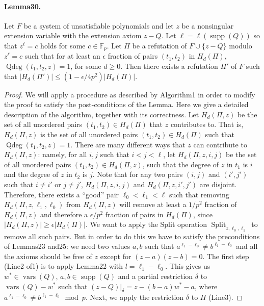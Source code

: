 \documentclass[10pt,a4paper]{article}
\DeclareMathOperator{\supp}{supp}
\DeclareMathOperator{\vars}{vars}
\DeclareMathOperator{\Qdeg}{Qdeg}
\DeclareMathOperator{\Split}{Split}
\begin{document}
\paragraph{Lemma30.} Let $F$ be a system of unsatisfiable polynomials and let $z$ be a nonsingular extension variable with the extension axiom $z-Q$. Let $\ell=\ell(\supp(Q))$ so that $z^{\ell}=c$ holds for some $c\in\mathbb F_p$. Let $\Pi$ be a refutation of $F\cup\{z-Q\}$ modulo $z^{\ell}=c$ such that for at least an $\epsilon$ fraction of pairs $(t_1,t_2)$ in $H_d(\Pi)$, $\Qdeg(t_1,t_2,z)=1$, for some $d\geq0$. Then there exists a refutation $\Pi'$ of $F$ such that $|H_d(\Pi')|\leq(1-\epsilon/4p^2)|H_d(\Pi)|$.
\begin{proof}
We will apply a procedure as described by Algorithm1 in order to modify the proof to satisfy the post-conditions of the Lemma. Here we give a detailed description of the algorithm, together with its correctness. Let $H_d(\Pi,z)$ be the set of all unordered pairs $(t_1,t_2)\in H_d(\Pi)$ that $z$ contributes to. That is, $H_d(\Pi,z)$ is the set of all unordered pairs $(t_1,t_2)\in H_d(\Pi)$ such that $\Qdeg(t_1,t_2,z)=1$. There are many different ways that $z$ can contribute to $H_d(\Pi,z)$: namely, for all $i,j$ such that $i<j<\ell$, let $H_d(\Pi,z,i,j)$ be the set of all unordered pairs $(t_1,t_2)\in H_d(\Pi,z)$, such that the degree of $z$ in $t_1$ is $i$ and the degree of $z$ in $t_2$ is $j$. Note that for any two pairs $(i,j)$ and $(i',j')$ such that $i\neq i'$ or $j\neq j'$, $H_d(\Pi,z,i,j)$ and $H_d(\Pi,z,i',j')$ are disjoint. Therefore, there exists a ``good'' pair $\ell_0<\ell_1<\ell$ such that removing $H_d(\Pi,z,\ell_1,\ell_0)$ from $H_d(\Pi,z)$ will remove at least a $1/p^2$ fraction of $H_d(\Pi,z)$ and therefore a $\epsilon/p^2$ fraction of pairs in $H_d(\Pi)$, since $|H_d(\Pi,z)|\geq\epsilon|H_d(\Pi)|$.
We want to apply the Split operation $\Split_{z,\ell_0,\ell_1}$ to remove all such pairs. But in order to do this we have to satisfy the preconditions of Lemmas23 and25: we need two values $a,b$ such that $a^{\ell_1-\ell_0}\neq b^{\ell_1-\ell_0}$ and all the axioms should be free of $z$ except for $(z-a)(z-b)=0$. The first step (Line2 of1) is to apply Lemma22 with $l=\ell_1-\ell_0$. This gives us $w^*\in\vars(Q)$, $a,b\in\supp(Q)$ and a partial restriction $\delta$ to $\vars(Q)-w^*$ such that $(z-Q)|_{\delta}=z-(b-a)w^*-a$, where $a^{\ell_1-\ell_0}\neq b^{\ell_1-\ell_0}\bmod p$. Next, we apply the restriction $\delta$ to $\Pi$ (Line3).

\end{proof}
\end{document}
